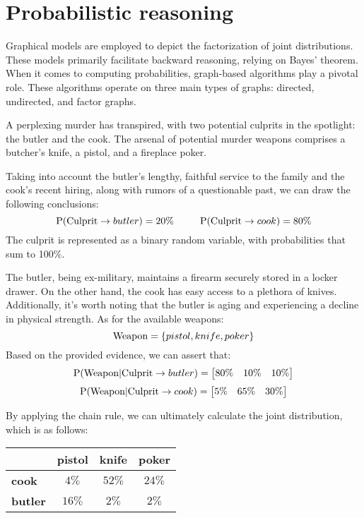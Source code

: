\section{Probabilistic reasoning}

Graphical models are employed to depict the factorization of joint distributions. 
These models primarily facilitate backward reasoning, relying on Bayes' theorem. 
When it comes to computing probabilities, graph-based algorithms play a pivotal role. 
These algorithms operate on three main types of graphs: directed, undirected, and factor graphs.
\begin{example}
    A perplexing murder has transpired, with two potential culprits in the spotlight: the butler and the cook. 
    The arsenal of potential murder weapons comprises a butcher's knife, a pistol, and a fireplace poker.

    Taking into account the butler's lengthy, faithful service to the family and the cook's recent hiring, along with rumors of a questionable past, we can draw the following conclusions:
    \[\textnormal{P}(\textnormal{Culprit}\rightarrow butler)=20\% \:\:\:\:\:\:\:\:\:\:\:\: \textnormal{P}(\textnormal{Culprit}\rightarrow cook)=80\%\]
    The culprit is represented as a binary random variable, with probabilities that sum to 100$\%$.

    The butler, being ex-military, maintains a firearm securely stored in a locker drawer. 
    On the other hand, the cook has easy access to a plethora of knives. 
    Additionally, it's worth noting that the butler is aging and experiencing a decline in physical strength. 
    As for the available weapons:        
    \[\textnormal{Weapon}=\{pistol,knife,poker\}\]
    Based on the provided evidence, we can assert that:
    \[\textnormal{P}(\textnormal{Weapon}|\textnormal{Culprit}\rightarrow butler)=\begin{bmatrix} 80\% & 10\% & 10\% \end{bmatrix}\]
    \[\textnormal{P}(\textnormal{Weapon}|\textnormal{Culprit}\rightarrow cook)=\begin{bmatrix} 5\% & 65\% & 30\% \end{bmatrix}\]
    
    By applying the chain rule, we can ultimately calculate the joint distribution, which is as follows:
    \begin{table}[H]
        \centering
        \begin{tabular}{c|ccc|}
        \cline{2-4}
                                                & \textbf{pistol} & \textbf{knife} & \textbf{poker} \\ \hline
        \multicolumn{1}{|l|}{\textbf{cook}}   & $4\%$           & $52\%$         & $24\%$         \\
        \multicolumn{1}{|l|}{\textbf{butler}} & $16\%$          & $2\%$          & $2\%$          \\ \hline
        \end{tabular}
    \end{table}


\end{example}
